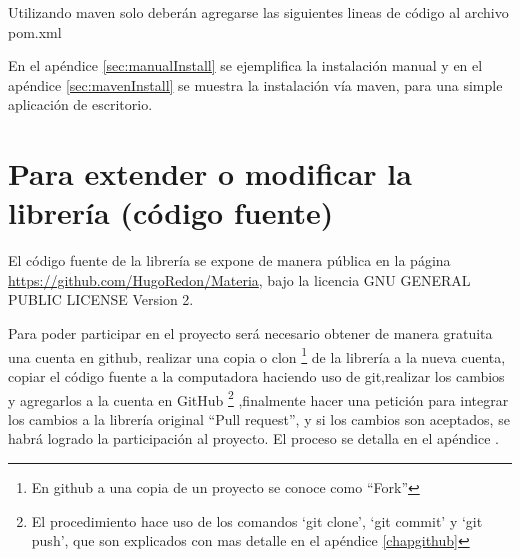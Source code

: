     Utilizando maven solo deberán agregarse las siguientes lineas de código al archivo pom.xml

    

    En el apéndice \ref{sec:manualInstall} se ejemplifica la instalación manual y en el apéndice \ref{sec:mavenInstall} se muestra la instalación vía maven, para una simple aplicación de escritorio.


  \section{Para extender o modificar la librería (código fuente)}

    El código fuente de la librería se expone de manera pública en la página \url{https://github.com/HugoRedon/Materia}, bajo la licencia GNU GENERAL PUBLIC LICENSE Version 2.
  
    Para poder participar en el proyecto será necesario obtener de manera gratuita una cuenta en github, realizar una copia o clon \footnote{En github a una copia de un proyecto se conoce como ``Fork''} de la librería  a la nueva cuenta, copiar el código fuente a la computadora haciendo uso de git,realizar los cambios y agregarlos a la cuenta en GitHub  \footnote{El procedimiento hace uso de los comandos `git clone', `git commit' y `git push', que son explicados con mas detalle en el apéndice \ref{chapgithub}} ,finalmente hacer una petición para integrar los cambios a la librería original ``Pull request'', y si los cambios son aceptados, se habrá logrado la participación al proyecto. El proceso se detalla en el apéndice .



